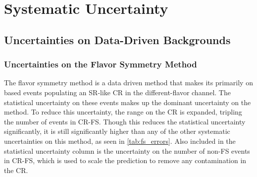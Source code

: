 
\chapter{Systematic Uncertainty} %

\label{ch:backgrounds} 

\section{Uncertainties on Data-Driven Backgrounds}

\subsection{Uncertainties on the Flavor Symmetry Method}
\label{sec:unc_fs}

The flavor symmetry method is a data driven method that makes its primarily on based events populating an \ac{SR}-like \ac{CR} in the different-flavor channel. The statistical uncertainty on these events makes up the dominant uncertainty on the method. To reduce this uncertainty, the \mll range on the \ac{CR} is expanded, tripling the number of events in CR-FS. Though this reduces the statistical uncertainty significantly, it is still significantly higher than any of the other systematic uncertainties on this method, as seen in \autoref{tab:fs_errors}. Also included in the statistical uncertainty column is the uncertainty on the number of non-\ac{FS} events in CR-FS, which is used to scale the prediction to remove any contamination in the \ac{CR}. 

